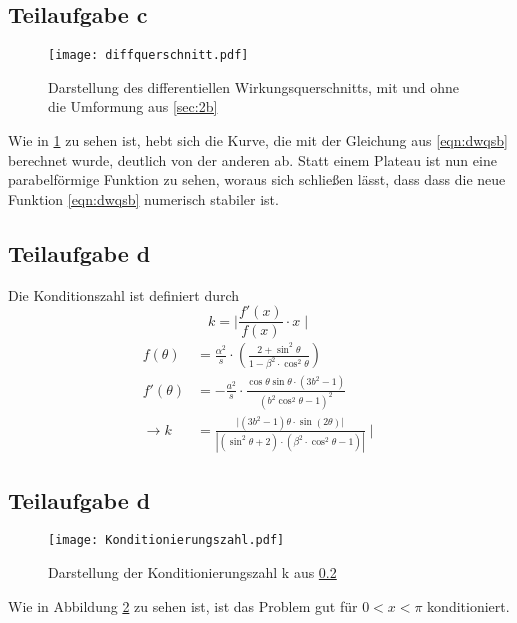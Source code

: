 \subsection{Teilaufgabe c}
\begin{figure}[H]
  \centering
  \texttt{[image: diffquerschnitt.pdf]}
  \caption{Darstellung des differentiellen Wirkungsquerschnitts, mit und ohne die Umformung aus \ref{sec:2b} }
  \label{fig:2b}
\end{figure}
Wie in \ref{fig:2b} zu sehen ist, hebt sich die Kurve, die mit der Gleichung aus \eqref{eqn:dwqsb} berechnet wurde, deutlich von der anderen ab.
Statt einem Plateau ist nun eine parabelförmige Funktion zu sehen, woraus sich schließen lässt, dass dass die neue Funktion \eqref{eqn:dwqsb} numerisch stabiler ist.

\subsection{Teilaufgabe d} \label{sec:2d}
Die Konditionszahl ist definiert durch
\begin{equation}
  k=\mid \frac{f'(x)}{f(x)} \cdot x \mid
\end{equation}
\begin{align}
  f(\theta) &= \frac{\alpha ^2}{s} \cdot \left(\frac{2+\sin^2{\theta}}{1-\beta^2 \cdot \cos^2{\theta}} \right) \\
  f'(\theta) &= -\frac{a^2}{s} \cdot \frac{\cos{\theta} \sin{\theta} \cdot \left(3b^2-1 \right)}{\left (b^2\cos^2{\theta}-1 \right)^2} \\
  \rightarrow k &=  \frac{|\left( 3b^2-1\right) \theta \cdot \sin {\left(2 \theta \right)|}}{| \left(\sin^2{\theta}+2 \right) \cdot \left(\beta^2 \cdot \cos^2{\theta}-1 \right )| } \mid
\end{align}

\subsection{Teilaufgabe d}
\begin{figure}[H]
  \centering
  \texttt{[image: Konditionierungszahl.pdf]}
  \caption{Darstellung der Konditionierungszahl k aus  \ref{sec:2d} }
  \label{fig:2d}
\end{figure}
Wie in Abbildung \ref{fig:2d} zu sehen ist, ist das Problem gut für $0<x<\pi$ konditioniert.
